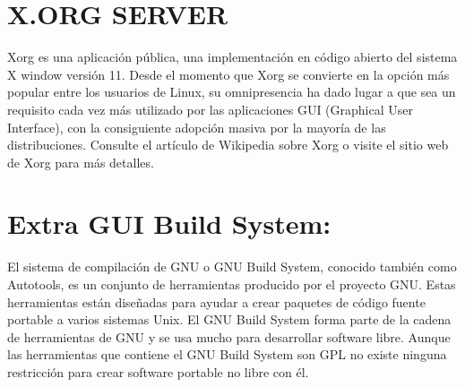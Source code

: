 \documentclass[a4paper, 11pt, oneside]{article}
\begin{document}
\section*{X.ORG SERVER}
Xorg es una aplicación pública, una implementación en código abierto del sistema X window versión 11. Desde el momento que Xorg se convierte en la opción más popular entre los usuarios de Linux, su omnipresencia ha dado lugar a que sea un requisito cada vez más utilizado por las aplicaciones GUI (Graphical User Interface), con la consiguiente adopción masiva por la mayoría de las distribuciones. Consulte el artículo de Wikipedia sobre Xorg o visite el sitio web de Xorg para más detalles.

\section*{Extra GUI Build System:}
El sistema de compilación de GNU o GNU Build System, conocido también como Autotools, es un conjunto de herramientas producido por el proyecto GNU. Estas herramientas están diseñadas para ayudar a crear paquetes de código fuente portable a varios sistemas Unix. El GNU Build System forma parte de la cadena de herramientas de GNU y se usa mucho para desarrollar software libre. Aunque las herramientas que contiene el GNU Build System son GPL no existe ninguna restricción para crear software portable no libre con él.
\end{document}
